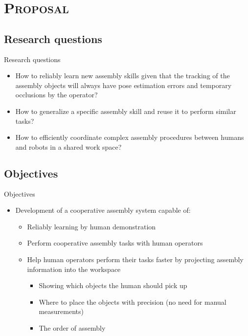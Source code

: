 \section{\scshape Proposal}\label{sec:proposal}

\subsection{Research questions}
\begin{frame}{Research questions}
	\begin{itemize}
		\item How to reliably learn new assembly skills given that the tracking of the assembly objects will always have pose estimation errors and temporary occlusions by the operator?
		\item How to generalize a specific assembly skill and reuse it to perform similar tasks?
		\item How to efficiently coordinate complex assembly procedures between humans and robots in a shared work space?
	\end{itemize}
\end{frame}

\subsection{Objectives}
\begin{frame}{Objectives}
	\begin{itemize}
		\item Development of a cooperative assembly system capable of:
		\begin{itemize}
			\item Reliably learning by human demonstration
			\item Perform cooperative assembly tasks with human operators
			\item Help human operators perform their tasks faster by projecting assembly information into the workspace
			\begin{itemize}
				\item Showing which objects the human should pick up
				\item Where to place the objects with precision (no need for manual measurements)
				\item The order of assembly
			\end{itemize}
		\end{itemize}

	\end{itemize}
\end{frame}

